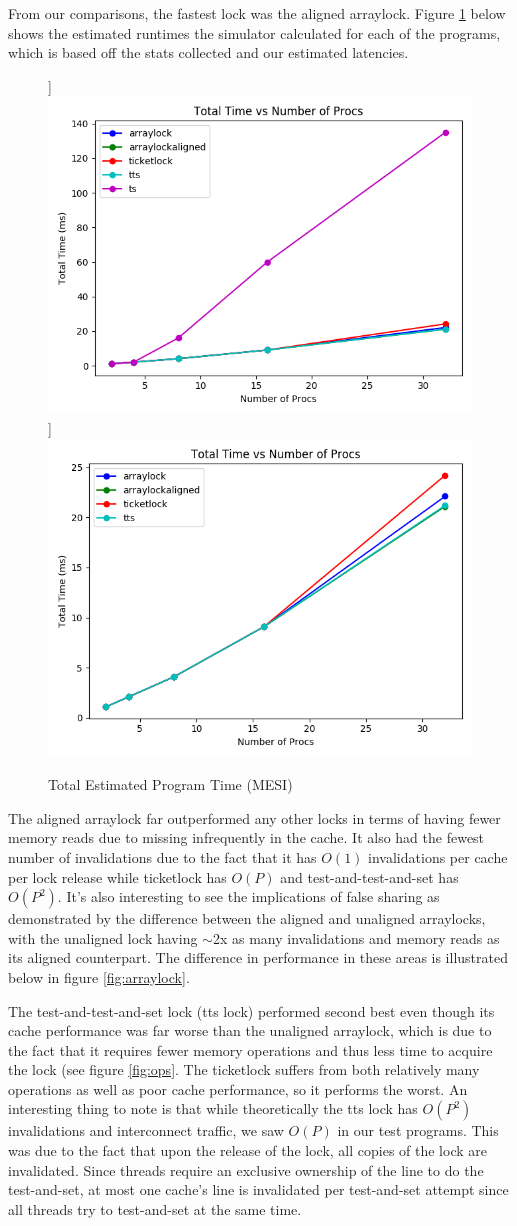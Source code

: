 \documentclass{article}
\def\inline{\lstinline[language=C++, basicstyle=\ttfamily]}
\begin{document}
From our comparisons, the fastest lock was the aligned arraylock.  Figure \ref{fig:speeds} below shows the estimated runtimes the simulator calculated for each of the programs, which is based off the stats collected and our estimated latencies.

\begin{figure}[h]%
    \centering
    \subfloat[\centering With \inline{ts_lock}]{{\includegraphics[width=.45\textwidth]{figures/ts_time.png}}}%
    \qquad
    \subfloat[\centering Without \inline{ts_lock}]{{\includegraphics[width=.45\textwidth]{figures/no_ts_time.png}}}%
    \caption{Total Estimated Program Time (MESI)}
    \label{fig:speeds}
\end{figure}

The aligned arraylock far outperformed any other locks in terms of having fewer memory reads due to missing infrequently in the cache. It also had the fewest number of invalidations due to the fact that it has $O(1)$ invalidations per cache per lock release while ticketlock has $O(P)$ and test-and-test-and-set has $O(P^2)$. It's also interesting to see the implications of false sharing as demonstrated by the difference between the aligned and unaligned arraylocks, with the unaligned lock having $\sim$2x as many invalidations and memory reads as its aligned counterpart. The difference in performance in these areas is illustrated below in figure \ref{fig:arraylock}.

The test-and-test-and-set lock (tts lock) performed second best even though its cache performance was far worse than the unaligned arraylock, which is due to the fact that it requires fewer memory operations and thus less time to acquire the lock (see figure \ref{fig:ops}.  The ticketlock suffers from both relatively many operations as well as poor cache performance, so it performs the worst.  An interesting thing to note is that while theoretically the tts lock has $O(P^2)$ invalidations and interconnect traffic, we saw $O(P)$ in our test programs. This was due to the fact that upon the release of the lock, all copies of the lock are invalidated.  Since threads require an exclusive ownership of the line to do the test-and-set, at most one cache's line is invalidated per test-and-set attempt since all threads try to test-and-set at the same time.
\end{document}
